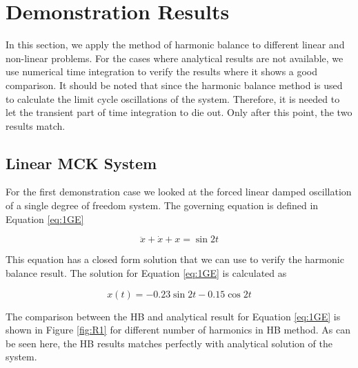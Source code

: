 \documentclass[12pt, a4paper]{extarticle}
\begin{document}
\section{Demonstration Results}
In this section, we apply the method of harmonic balance to different linear and non-linear problems. For the cases where analytical results are not available, we use numerical time integration to verify the results where it shows a good comparison. It should be noted that since the harmonic balance method is used to calculate the limit cycle oscillations of the system. Therefore, it is needed to let the transient part of time integration to die out. Only after this point, the two results match.

\subsection{Linear MCK System}
For the first demonstration case we looked at the forced linear damped oscillation of a single degree of freedom system. The governing equation is defined in Equation \eqref{eq:1GE}

\begin{equation}\label{eq:1GE}
	\ddot{x} + \dot{x} + x = \sin 2t
\end{equation}

This equation has a closed form solution that we can use to verify the harmonic balance result. The solution for Equation \eqref{eq:1GE} is calculated as

\begin{equation}
	x(t) = -0.23 \sin 2t - 0.15 \cos 2t
\end{equation}

The comparison between the HB and analytical result for Equation \eqref{eq:1GE} is shown in Figure \ref{fig:R1} for different number of harmonics in HB method. As can be seen here, the HB results matches perfectly with analytical solution of the system.
\end{document}
